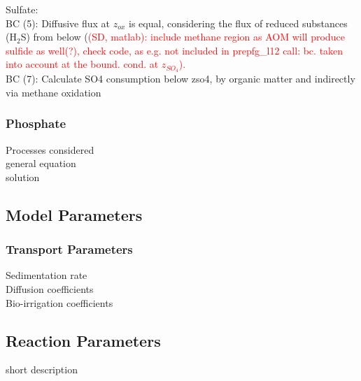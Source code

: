 \documentclass[gmd, manuscript]{copernicus}
\begin{document}
Sulfate:\\
BC (5): Diffusive flux at $z_{ox}$ is equal, considering the flux of reduced substances (H$_2$S) from below (\textcolor{red}{(SD, matlab): include methane region as AOM will produce sulfide as well(?), 
check code, as e.g. not included in prepfg\_l12 call: bc. taken into account at the bound. cond. at $z_{SO_4}$).} \\
BC (7): Calculate SO4 consumption below zso4, by organic matter and indirectly via methane oxidation

\subsubsection{Phosphate}
Processes considered\\ 
general equation\\
solution\\


\subsection{Model Parameters}
\subsubsection{Transport Parameters}
Sedimentation rate\\
Diffusion coefficients\\
Bio-irrigation coefficients\\

\subsection {Reaction Parameters}
short description
\end{document}
